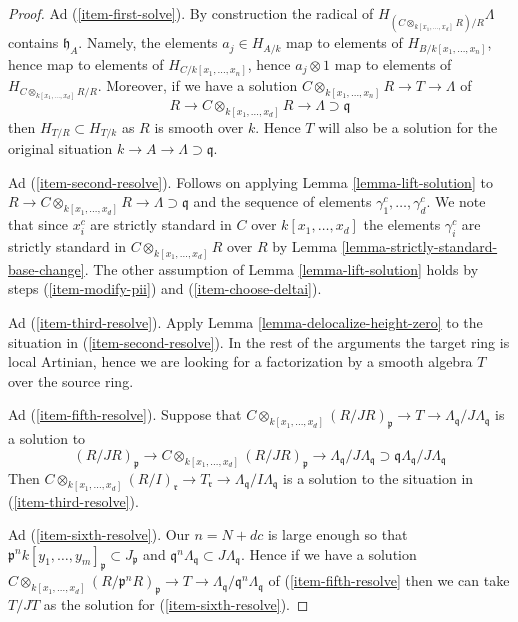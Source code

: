 \begin{proof}
\medskip\noindent
Ad (\ref{item-first-solve}). By construction the radical of
$H_{(C \otimes_{k[x_1, \ldots, x_d]} R)/R} \Lambda$ contains
$\mathfrak h_A$. Namely, the elements $a_j \in H_{A/k}$
map to elements of $H_{B/k[x_1, \ldots, x_n]}$, hence map to elements
of $H_{C/k[x_1, \ldots, x_n]}$, hence $a_j \otimes 1$ map to elements of
$H_{C \otimes_{k[x_1, \ldots, x_d]} R/R}$. Moreover, if we have a solution
$C \otimes_{k[x_1, \ldots, x_n]} R \to T \to \Lambda$ of
$$
R
\to
C \otimes_{k[x_1, \ldots, x_d]} R
\to
\Lambda \supset \mathfrak q
$$
then $H_{T/R} \subset H_{T/k}$ as $R$ is smooth over $k$.
Hence $T$ will also be a solution for
the original situation $k \to A \to \Lambda \supset \mathfrak q$.

\medskip\noindent
Ad (\ref{item-second-resolve}). Follows on applying
Lemma \ref{lemma-lift-solution} to
$R \to C \otimes_{k[x_1, \ldots, x_d]} R
\to \Lambda \supset \mathfrak q$ and the sequence of
elements $\gamma_1^c, \ldots, \gamma_d^c$. We note that since $x_i^c$
are strictly standard in $C$ over $k[x_1, \ldots, x_d]$ the elements
$\gamma_i^c$ are strictly standard in $C \otimes_{k[x_1, \ldots, x_d]} R$
over $R$ by Lemma \ref{lemma-strictly-standard-base-change}.
The other assumption of Lemma \ref{lemma-lift-solution} holds by steps
(\ref{item-modify-pii}) and (\ref{item-choose-deltai}).

\medskip\noindent
Ad (\ref{item-third-resolve}). Apply Lemma \ref{lemma-delocalize-height-zero}
to the situation in (\ref{item-second-resolve}). In the rest of the
arguments the target ring is local Artinian, hence we are looking for
a factorization by a smooth algebra $T$ over the source ring.

\medskip\noindent
Ad (\ref{item-fifth-resolve}).
Suppose that $C \otimes_{k[x_1, \ldots, x_d]} (R/JR)_\mathfrak p \to
T \to \Lambda_\mathfrak q/J\Lambda_\mathfrak q$ is a solution to
$$
(R/JR)_\mathfrak p \to
C \otimes_{k[x_1, \ldots, x_d]} (R/JR)_\mathfrak p \to
\Lambda_\mathfrak q/J\Lambda_\mathfrak q
\supset
\mathfrak q\Lambda_\mathfrak q/J\Lambda_\mathfrak q
$$
Then $C \otimes_{k[x_1, \ldots, x_d]} (R/I)_\mathfrak r \to T_\mathfrak r \to
\Lambda_\mathfrak q/I\Lambda_\mathfrak q$
is a solution to the situation in (\ref{item-third-resolve}).

\medskip\noindent
Ad (\ref{item-sixth-resolve}). Our $n = N + dc$ is large enough so that
$\mathfrak p^nk[y_1, \ldots, y_m]_\mathfrak p \subset J_\mathfrak p$
and $\mathfrak q^n \Lambda_\mathfrak q \subset J\Lambda_\mathfrak q$.
Hence if we have a solution
$C \otimes_{k[x_1, \ldots, x_d]} (R/\mathfrak p^nR)_\mathfrak p \to
T \to \Lambda_\mathfrak q/\mathfrak q^n\Lambda_\mathfrak q$
of (\ref{item-fifth-resolve}
then we can take $T/JT$ as the solution for
(\ref{item-sixth-resolve}).


\end{proof}
